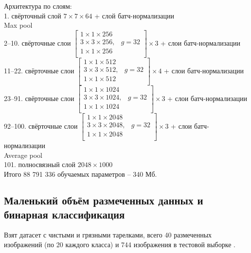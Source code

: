 Архитектура по слоям:\\
1. свёрточный слой $7\times7\times64$ + слой батч-нормализации\\
Max pool\\
2--10. свёрточные слои $\begin{bmatrix}
1\times1\times256\\
3\times3\times256,& g=32\\
1\times1\times256\\
\end{bmatrix} \times3$ + слои батч-нормализации\\
11--22. свёрточные слои $\begin{bmatrix}
1\times1\times512\\
3\times3\times512,& g=32\\
1\times1\times512\\
\end{bmatrix} \times4$ + слои батч-нормализации\\
23--91. свёрточные слои $\begin{bmatrix}
1\times1\times1024\\
3\times3\times1024,& g=32\\
1\times1\times1024\\
\end{bmatrix} \times3$ + слои батч-нормализации\\
92--100. свёрточные слои $\begin{bmatrix}
1\times1\times2048\\
3\times3\times2048,& g=32\\
1\times1\times2048\\
\end{bmatrix} \times3$ + слои батч-нормализации\\
Average pool\\
101. полносвязный слой $2048\times1000$\\

Итого 88 791 336 обучаемых параметров -- 340 Мб.

\subsection{Маленький объём размеченных данных и бинарная классификация}
Взят датасет с чистыми и грязными тарелками, всего 40 размеченных изображений (по 20 каждого класса) и 744 изображения в тестовой выборке \cite{dsplates}. 

